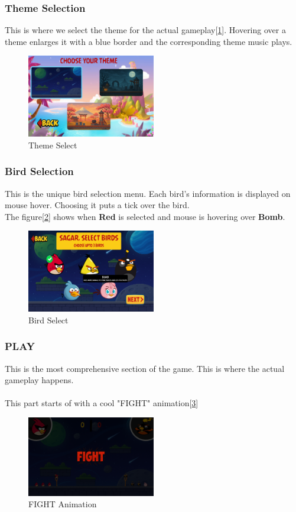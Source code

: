 \documentclass{article}
\begin{document}
\subsubsection{Theme Selection}
This is where we select the theme for the actual gameplay[\ref{fig:Theme}]. Hovering over a theme enlarges it with a blue border and the corresponding theme music plays.
\begin{figure}[h]
    \centering
    \includegraphics[width=0.5\textwidth]{Theme.png}
    \caption{Theme Select}\label{fig:Theme}
\end{figure}


\subsubsection{Bird Selection}
This is the unique bird selection menu. Each bird's information is displayed on mouse hover. Choosing it puts a tick over the bird.\\
The figure[\ref{fig:Select}] shows when \textbf{Red} is selected and mouse is hovering over \textbf{Bomb}.
\begin{figure}[h]
    \centering
    \includegraphics[width=0.5\textwidth]{Select.png}
    \caption{Bird Select}\label{fig:Select}
\end{figure}
\newpage
\subsubsection{PLAY}
This is the most comprehensive section of the game. This is where the actual gameplay happens.\\
\\This part starts of with a cool "FIGHT" animation[\ref{fig:Fight}]\\
\begin{figure}[h]
    \centering
    \includegraphics[width=0.5\textwidth]{Fight.png}
    \caption{FIGHT Animation}\label{fig:Fight}
\end{figure}
\end{document}
